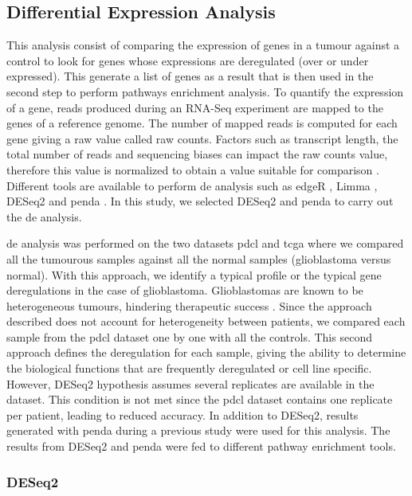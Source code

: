 \subsection{Differential Expression Analysis}

This analysis consist of comparing the expression of genes in a tumour against a control to look for genes whose expressions are deregulated (over or under expressed).
This generate a list of genes as a result that is then used in the second step to perform pathways enrichment analysis.
To quantify the expression of a gene, reads produced during an RNA-Seq experiment are mapped to the genes of a reference genome.
The number of mapped reads is computed for each gene giving a raw value called raw counts.
Factors such as transcript length, the total number of reads and sequencing biases can impact the raw counts value, therefore this value is normalized to obtain a value suitable for comparison \cite*{Conesa2016}.
Different tools are available to perform \acrshort{de} analysis such as edgeR \cite*{Robinson2010}, Limma \cite*{Ritchie2015}, DESeq2 \cite*{Love2014} and \acrshort{penda} \cite*{Richard2020}.
In this study, we selected DESeq2 \cite*{Love2014} and \acrfull{penda} to carry out the \acrshort{de} analysis.

\acrshort{de} analysis was performed on the two datasets \acrshort{pdcl} and \acrshort{tcga} where we compared all the tumourous samples against all the normal samples (glioblastoma versus normal).
With this approach, we identify a typical profile or the typical gene deregulations in the case of glioblastoma.
Glioblastomas are known to be heterogeneous tumours, hindering therapeutic success \cite*{Neftel2019,Delgado-Lopez2016, Quinones2018}.
Since the approach described does not account for heterogeneity between patients, we compared each sample from the \acrshort{pdcl} dataset one by one with all the controls.
This second approach defines the deregulation for each sample, giving the ability to determine the biological functions that are frequently deregulated or cell line specific.
However, DESeq2 hypothesis assumes several replicates are available in the dataset.
This condition is not met since the \acrshort{pdcl} dataset contains one replicate per patient, leading to reduced accuracy.
In addition to DESeq2, results generated with \acrshort{penda} during a previous study were used for this analysis.
The results from DESeq2 and \acrshort{penda} were fed to different pathway enrichment tools.

\subsubsection{DESeq2}

